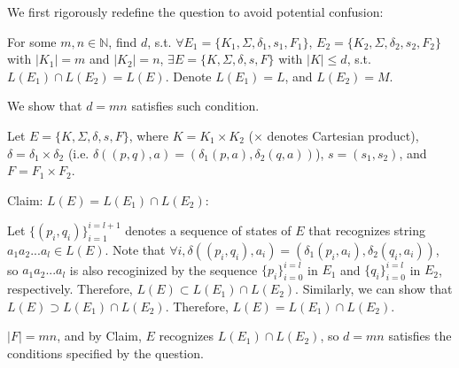 \documentclass[10pt,a4paper]{article}
\begin{document}
We first rigorously redefine the question to avoid potential confusion:\par
For some $m,n\in\mathbb{N}$, find $d$, s.t. $\forall E_1=\{K_1,\Sigma,\delta_1,s_1,F_1\}$, $E_2=\{K_2,\Sigma,\delta_2,s_2,F_2\}$ with $|K_1|=m$ and $|K_2|=n$, $\exists E=\{K,\Sigma,\delta,s,F\}$ with $|K|\le d$, s.t. $L(E_1)\cap L(E_2)=L(E)$. Denote $L(E_1)=L$, and $L(E_2)=M$. \par

We show that $d=mn$ satisfies such condition.\par

Let $E=\{K,\Sigma,\delta,s,F\}$, where $K=K_1\times K_2$ ($\times$ denotes Cartesian product), $\delta=\delta_1\times\delta_2$ (i.e. $\delta((p,q),a)=(\delta_1(p,a),\delta_2(q,a))$), $s=(s_1,s_2)$, and $F=F_1\times F_2$. \par 
Claim: $L(E)=L(E_1)\cap L(E_2)$:\par

Let $\{(p_i,q_i)\}_{i=1}^{i=l+1}$ denotes a sequence of states of $E$ that recognizes string $a_1a_2...a_l\in L(E)$. Note that $\forall i,\delta((p_i,q_i),a_i)=(\delta_1(p_i,a_i),\delta_2(q_i,a_i))$, so $a_1a_2...a_l$ is also recoginized by the sequence $\{p_i\}_{i=0}^{i=l}$ in $E_1$ and $\{q_i\}_{i=0}^{i=l}$ in $E_2$, respectively. Therefore, $L(E)\subset L(E_1)\cap L(E_2)$. Similarly, we can show that $L(E)\supset L(E_1)\cap L(E_2)$. Therefore, $L(E)=L(E_1)\cap L(E_2)$.\par

$|F|=mn$, and by Claim, $E$ recognizes $L(E_1)\cap L(E_2)$, so $d=mn$ satisfies the conditions specified by the question.
\end{document}
